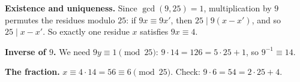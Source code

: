 \textbf{Existence and uniqueness.} Since $\gcd(9,25)=1$, multiplication by $9$ permutes the residues modulo $25$: if $9x\equiv9x'$, then $25\mid9(x-x')$, and so $25\mid x-x'$. So exactly one residue $x$ satisfies $9x\equiv4$.

\textbf{Inverse of $9$.} We need $9y\equiv1\pmod{25}$: $9\cdot14=126=5\cdot25+1$, so $9^{-1}\equiv14$.

\textbf{The fraction.} $x\equiv4\cdot14=56\equiv\boxed{6}\pmod{25}$. Check: $9\cdot6=54=2\cdot25+4$.
